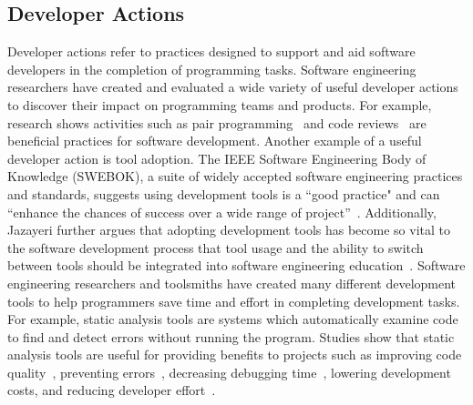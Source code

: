 \subsection{Developer Actions}

Developer actions refer to practices designed to support and aid software developers in the completion of programming tasks. Software engineering researchers have created and evaluated a wide variety of useful developer actions to discover their impact on programming teams and products. For example, research shows activities such as pair programming~\cite{WilliamsPairProgramming} and code reviews~\cite{bacchelli2013codereview} are beneficial practices for software development. Another example of a useful developer action is tool adoption. The IEEE Software Engineering Body of Knowledge (SWEBOK), a suite of widely accepted software engineering practices and standards, suggests using development tools is a ``good practice" and can ``enhance the chances of success over a wide range of project”~\cite[p.~A-4]{SWEBOK}. Additionally, Jazayeri further argues that adopting development tools has become so vital to the software development process that tool usage and the ability to switch between tools should be integrated into software engineering education~\cite{jazayeri2004education}. Software engineering researchers and toolsmiths have created many different development tools to help programmers save time and effort in completing development tasks. For example, static analysis tools are systems which automatically examine code to find and detect errors without running the program. Studies show that static analysis tools are useful for providing benefits to projects such as improving code quality~\cite{GoogleFixit}, preventing errors~\cite{bessey2010few}, decreasing debugging time~\cite{Williams2007FaultFixTime}, lowering development costs, and reducing developer effort~\cite{singh2017staticreview}.


